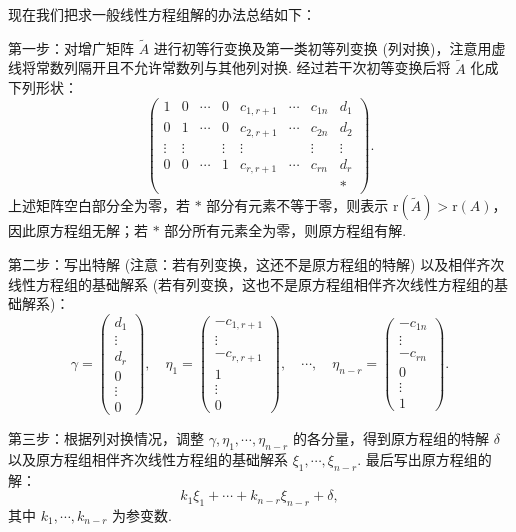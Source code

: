 \documentclass[UTF8, 12pt, fontset=fandol, oneside]{ctexart}
\begin{document}
现在我们把求一般线性方程组解的办法总结如下：

第一步：对增广矩阵 $\widetilde{A}$ 进行初等行变换及第一类初等列变换 (列对换)，注意用虚线将常数列隔开且不允许常数列与其他列对换. 经过若干次初等变换后将 $\widetilde{A}$ 化成下列形状：
\[
\left(\begin{array}{ccccccc|c}
1&0&\cdots&0&c_{1,r+1}&\cdots&c_{1n}&d_1\\
0&1&\cdots&0&c_{2,r+1}&\cdots&c_{2n}&d_2\\
\vdots&\vdots&&\vdots&\vdots&&\vdots&\vdots\\
0&0&\cdots&1&c_{r,r+1}&\cdots&c_{rn}&d_r\\
&&&&&&&*
\end{array}\right).
\]
上述矩阵空白部分全为零，若 $*$ 部分有元素不等于零，则表示 $\mathrm{r}(\widetilde{A})>\mathrm{r}(A)$，因此原方程组无解；若 $*$ 部分所有元素全为零，则原方程组有解.

第二步：写出特解 (注意：若有列变换，这还不是原方程组的特解) 以及相伴齐次线性方程组的基础解系 (若有列变换，这也不是原方程组相伴齐次线性方程组的基础解系)：
\[
\gamma=\left(\begin{array}{c}
d_1\\
\vdots\\
d_r\\
0\\
\vdots\\
0
\end{array}\right),\quad
\eta_1=\left(\begin{array}{c}
-c_{1,r+1}\\
\vdots\\
-c_{r,r+1}\\
1\\
\vdots\\
0
\end{array}\right),\quad \cdots,\quad
\eta_{n-r}=\left(\begin{array}{c}
-c_{1n}\\
\vdots\\
-c_{rn}\\
0\\
\vdots\\
1
\end{array}\right).
\]

第三步：根据列对换情况，调整 $\gamma,\eta_1,\cdots,\eta_{n-r}$ 的各分量，得到原方程组的特解 $\delta$ 以及原方程组相伴齐次线性方程组的基础解系 $\xi_1,\cdots,\xi_{n-r}$. 最后写出原方程组的解：
\[
k_1\xi_1+\cdots+k_{n-r}\xi_{n-r}+\delta,
\]
其中 $k_1,\cdots,k_{n-r}$ 为参变数.
\end{document}
